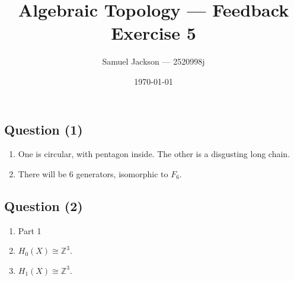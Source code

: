 \documentclass{article}
\title{Algebraic Topology  --- Feedback Exercise 5}
\author{Samuel Jackson --- 2520998j}
\date{\today}
\begin{document}
\maketitle

\newcommand{\R}{\mathbb{R}}
\newcommand{\Z}{\mathbb{Z}}
\newcommand{\N}{\mathbb{N}}
\newcommand{\fund}{\pi_1}
\newcommand{\pind}{p_{\ast}}

\begin{center}
    \section*{Question (1)}
\end{center}

\begin{flushleft}
	\begin{enumerate}[label=\alph*)]
		\item One is circular, with pentagon inside. The other is a disgusting long chain.
		\item There will be 6 generators, isomorphic to $F_6$.
	\end{enumerate}
\end{flushleft}
\begin{center}
    \section*{Question (2)}
\end{center}

\begin{flushleft}
	\begin{enumerate}[label=\alph*)]
		\item Part 1
		\item $H_0(X) \cong \Z^3$.
		\item $H_1(X) \cong \Z^3$.
	\end{enumerate}
\end{flushleft}
\end{document}
